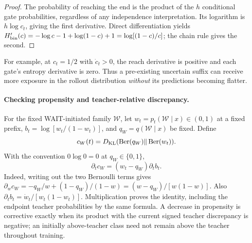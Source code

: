 \begin{proof}
The probability of reaching the end is the product of the $h$ conditional gate probabilities, regardless of any independence interpretation. Its logarithm is $h\log c_t$, giving the first derivative. Direct differentiation yields $H_{\rm bin}'(c)=-\log c-1+\log(1-c)+1=\log[(1-c)/c]$; the chain rule gives the second.
\end{proof}
For example, at $c_t=1/2$ with $\dot c_t>0$, the reach derivative is positive and each gate's entropy derivative is zero. Thus a pre-existing uncertain suffix can receive more exposure in the rollout distribution \emph{without} its predictions becoming flatter.


\paragraph{Checking propensity and teacher-relative discrepancy.}
\label{app:checking-sensitivity}
For the fixed WAIT-initiated family $\mathcal W$, let $w_t=p_t(\mathcal W\mid x)\in(0,1)$ at a fixed prefix, $b_t=\log[w_t/(1-w_t)]$, and $q_W=q(\mathcal W\mid x)$ be fixed. Define
\[
 c_W(t)=D_{\rm KL}(\operatorname{Ber}(q_W)\Vert\operatorname{Ber}(w_t)).
\]
With the convention $0\log0=0$ at $q_W\in\{0,1\}$,
\[
 \partial_t c_W=(w_t-q_W)\partial_t b_t.
\]
Indeed, writing out the two Bernoulli terms gives
$\partial_wc_W=-q_W/w+(1-q_W)/(1-w)=(w-q_W)/[w(1-w)]$.
Also $\partial_t b_t=\dot w_t/[w_t(1-w_t)]$. Multiplication proves the identity, including the endpoint teacher probabilities by the same formula. A decrease in propensity is corrective exactly when its product with the current signed teacher discrepancy is negative; an initially above-teacher class need not remain above the teacher throughout training.
